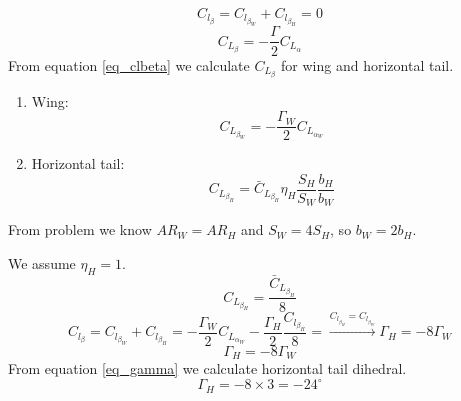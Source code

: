 $$C_{l_\beta} = C_{l_{\beta_W}} + C_{l_{\beta_H}} = 0$$
\begin{equation}
	C_{L_\beta} = -\dfrac{\Gamma}{2}C_{L_\alpha}
	\label{eq_clbeta}
\end{equation}
From equation \ref{eq_clbeta} we calculate $C_{L_\beta}$ for wing and horizontal tail.
\begin{enumerate}
	\item Wing:
	$$C_{L_{\beta_W}} = -\dfrac{\Gamma_W}{2}C_{L_{\alpha_W}}$$
	\item Horizontal tail:
	$$C_{L_{\beta_H}} = \bar C_{L_{\beta_H}} \eta_H \dfrac{S_H}{S_W}\dfrac{b_H}{b_W}$$
\end{enumerate}
From problem we know $AR_W = AR_H$ and $S_W = 4S_H$, so $b_W = 2b_H$.


We assume $\eta_H = 1$.
$$C_{L_{\beta_H}} = \dfrac{\bar C_{L_{\beta_H}}}{8}$$
$$
C_{l_\beta} = C_{l_{\beta_W}} + C_{l_{\beta_H}} = -\dfrac{\Gamma_W}{2}C_{L_{\alpha_W}} 
 -\dfrac{\Gamma_H}{2}\dfrac{C_{l_{\beta_H}}}{8} = \xrightarrow{C_{l_{\beta_H}} = C_{l_{\beta_W}}} \Gamma_H = -8\Gamma_W
$$
\begin{equation}
	\Gamma_H = -8\Gamma_W
	\label{eq_gamma}
\end{equation}
From equation \ref{eq_gamma} we calculate horizontal tail dihedral.
$$\Gamma_H = -8 \times 3 = -24^{\circ}$$
